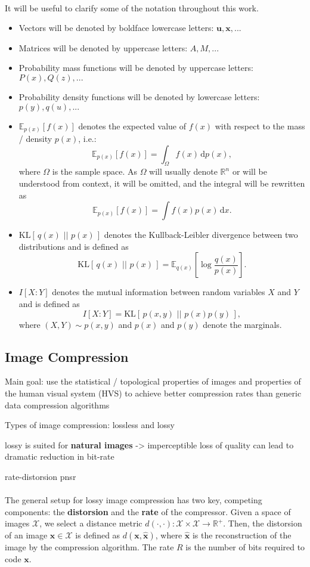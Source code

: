 \documentclass{article}
\renewcommand{\vec}[1]{\mathbf{#1}}
\renewcommand{\d}{\,\text{d}}
\newcommand{\KL}[2]{\mathrm{KL}[\,#1\,\,||\,\,#2\,]}
\newcommand{\Exp}{\mathbb{E}}
\newcommand{\ImSpace}{\mathcal{X}}
\newcommand{\Reals}{\mathbb{R}}
\begin{document}
\paragraph{}
It will be useful to clarify some of the notation throughout this work.
\begin{itemize}
\item Vectors will be denoted by boldface lowercase letters: $\vec{u}, \vec{x}, ...$
\item Matrices will be denoted by uppercase letters: $A, M, ...$
\item Probability mass functions will be denoted by uppercase letters: $P(x),
  Q(z), ...$
\item Probability density functions will be denoted by lowercase letters: $p(y),
  q(u), ...$
\item $\Exp_{p(x)}[f(x)]$ denotes the expected value of $f(x)$ with respect to
  the mass / density $p(x)$, i.e.:
  \[
    \Exp_{p(x)}[f(x)] = \int_\Omega f(x) \d p(x),
  \]
  where $\Omega$ is the sample space. As $\Omega$ will usually denote $\Reals^n$
  or will be understood from context, it will be omitted, and the integral will
  be rewritten as
  \[
    \Exp_{p(x)}[f(x)] = \int f(x)p(x) \d x.
  \]
\item $\KL{q(x)}{p(x)}$ denotes the Kullback-Leibler divergence between two
  distributions and is defined as
  \[
    \KL{q(x)}{p(x)} = \Exp_{q(x)}\left[\log\frac{q(x)}{p(x)}\right].
  \]
\item $I[X : Y]$ denotes the mutual information between random variables $X$ and
  $Y$ and is defined as
  \[
    I[X : Y] = \KL{p(x, y)}{p(x)p(y)},
  \]
  where $(X, Y) \sim p(x, y)$ and $p(x)$ and $p(y)$ denote the marginals.
\end{itemize}
\subsection{Image Compression}
Main goal: use the statistical / topological properties of images and properties
of the human visual system (HVS) to achieve
better compression rates than generic data compression algorithms

Types of image compression: lossless and lossy
\cite{townsend2019practical}

lossy is suited for \textbf{natural images} -> imperceptible loss of quality can
lead to dramatic reduction in bit-rate

rate-distorsion
pnsr
\paragraph{}
The general setup for lossy image compression has two key, competing components:
the \textbf{distorsion} and the \textbf{rate} of the compressor. Given a space
of images $\ImSpace$, we select a distance metric $d(\cdot, \cdot): \ImSpace
\times \ImSpace \rightarrow \Reals^+$. Then, the distorsion of an image $\vec{x}
\in \ImSpace$ is defined as $d(\vec{x}, \hat{\vec{x}})$, where $\hat{\vec{x}}$
is the reconstruction of the image by the compression algorithm. The rate $R$
is the number of bits required to code $\vec{x}$.
\end{document}
